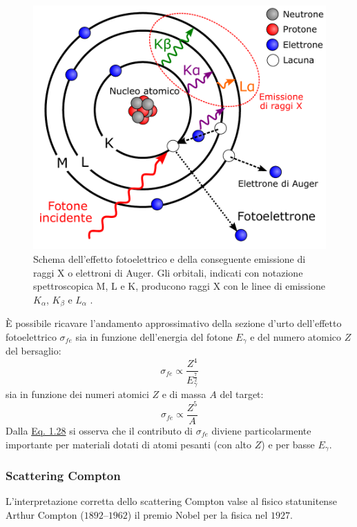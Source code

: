 \documentclass[12pt,a4paper,twoside]{report}
\begin{document}
	\begin{figure}[H]
		\centering
		\includegraphics[width=0.8\linewidth]{fotoelettrico.pdf}
		\caption{Schema dell'effetto fotoelettrico e della conseguente emissione di raggi X o elettroni di Auger. Gli orbitali, indicati con notazione spettroscopica M, L e K, producono raggi X con le linee di emissione $K_\alpha$, $K_\beta$ e $L_\alpha$ \cite{ompInterations}.}
		\label{fig:fotoelettrico}
	\end{figure}
	\`E possibile ricavare l'andamento approssimativo della sezione d'urto dell'effetto fotoelettrico $\sigma_{fe}$ sia in funzione dell'energia del fotone $E_\gamma$ e del numero atomico $Z$ del bersaglio:
	\begin{equation}
		\sigma_{fe}\propto \frac{Z^4}{E^{\frac{7}{2}}_\gamma}
		\label{eq:sigma_fe1}
	\end{equation}
	sia in funzione dei numeri atomici $Z$ e di massa $A$ del target:
	\begin{equation}
		\sigma_{fe}\propto \frac{Z^5}{A}
		\label{eq:sigma_fe2}
	\end{equation}
	Dalla \hyperref[eq:sigma_fe1]{Eq. 1.28} si osserva che il contributo di $\sigma_{fe}$ diviene particolarmente importante per materiali dotati di atomi pesanti (con alto $Z$) e per basse $E_\gamma$.
	
	\subsubsection{Scattering Compton}
	L'interpretazione corretta dello scattering Compton valse al fisico statunitense Arthur Compton ($1892$--$1962$) il premio Nobel per la fisica nel $1927$.
	
\end{document}
